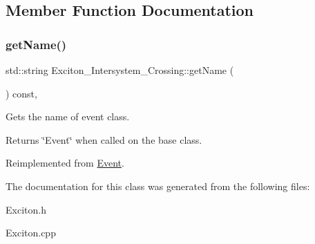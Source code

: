 \subsection{Member Function Documentation}
\mbox{\label{class_exciton___intersystem___crossing_aa9a743fa3ab0ebc24abeaacef0590488}} 
\subsubsection{\texorpdfstring{get\+Name()}{getName()}}
{\footnotesize\ttfamily std\+::string Exciton\+\_\+\+Intersystem\+\_\+\+Crossing\+::get\+Name (\begin{DoxyParamCaption}{ }\end{DoxyParamCaption}) const\hspace{0.3cm}{\ttfamily [inline]}, {\ttfamily [virtual]}}



Gets the name of event class. 

\begin{DoxyReturn}{Returns}
\char`\"{}\+Event\char`\"{} when called on the base class. 
\end{DoxyReturn}


Reimplemented from \hyperlink{class_event_a8c38a406d844d05eac1ef007bad2487f}{Event}.



The documentation for this class was generated from the following files\+:\begin{DoxyCompactItemize}
\item 
Exciton.\+h\item 
Exciton.\+cpp\end{DoxyCompactItemize}
